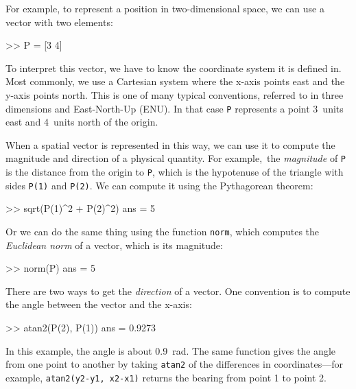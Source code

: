 \documentclass[../../book.tex]{subfiles}
\begin{document}

For example, to represent a position in two-dimensional space, we can use a vector with two elements:

\begin{code}
>> P = [3 4]
\end{code}

To interpret this vector, we have to know the coordinate system it is defined in.  Most commonly, we use a Cartesian system where the x-axis points east and the y-axis points north.  This is one of many typical conventions, referred to in three dimensions and East-North-Up (ENU). In that case \lstinline{P} represents a point 3~units east and 4~units north of the origin.


When a spatial vector is represented in this way, we can use it to compute the magnitude and direction of a physical quantity.
For example,~the \emph{magnitude} of \lstinline{P} is the distance from the origin to \lstinline{P}, which is the hypotenuse of the triangle with sides \lstinline{P(1)} and \lstinline{P(2)}.
We can compute it using the Pytha\-gorean theorem:

\begin{code}
>> sqrt(P(1)^2 + P(2)^2)
ans = 5
\end{code}

Or we can do the same thing using the function \lstinline{norm}, which computes the
\emph{Euclidean norm} of a vector, which is its magnitude:


\begin{code}
>> norm(P)
ans = 5
\end{code}

There are two ways to get the \emph{direction} of a vector.  One convention is to compute the angle between the vector and the x-axis:

\begin{code}
>> atan2(P(2), P(1))
ans = 0.9273
\end{code}

In this example, the angle is about \SI{0.9}{\radian}.  The same function gives the angle from one point to another by taking \lstinline{atan2} of the differences in coordinates---for example, \lstinline{atan2(y2-y1, x2-x1)} returns the bearing from point 1 to point 2.
\end{document}
